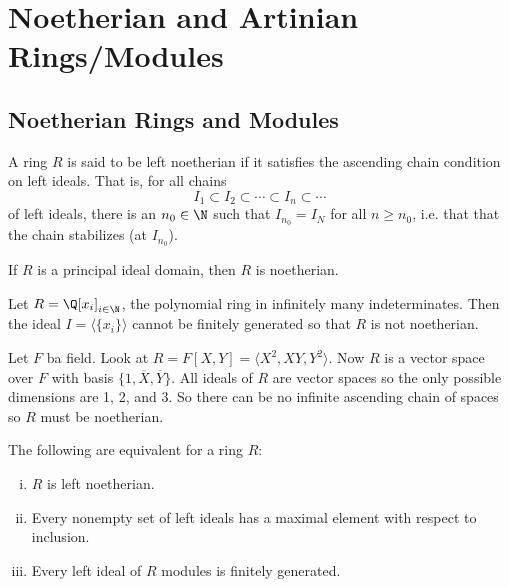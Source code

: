 
\newpage
\section{Noetherian and Artinian Rings/Modules}

\subsection{Noetherian Rings and Modules}

\begin{dfn}
A ring $R$ is said to be left noetherian if it satisfies the ascending chain condition on left ideals. That is, for all chains
\[
I_1 \subset I_2 \subset \cdots \subset I_n \subset \cdots
\]
of left ideals, there is an $n_0 \in \N$ such that $I_{n_0}=I_N$ for all $n \geq n_0$, i.e. that that the chain stabilizes (at $I_{n_0}$).
\end{dfn}

\begin{ex}
If $R$ is a principal ideal domain, then $R$ is noetherian.
\end{ex}

\begin{ex}
Let $R=\Q[x_i]_{i \in \N}$, the polynomial ring in infinitely many indeterminates. Then the ideal $I=\langle \{x_i\} \rangle$ cannot be finitely generated so that $R$ is not noetherian. 
\end{ex}

\begin{ex}
Let $F$ ba  field. Look at $R=F[X,Y]=\langle X^2,XY,Y^2\rangle$. Now $R$ is a vector space over $F$ with basis $\{1,\overline{X},\overline{Y}\}$. All ideals of $R$ are vector spaces so the only possible dimensions are 1, 2, and 3. So there can be no infinite ascending chain of spaces so $R$ must be noetherian. 
\end{ex}

\begin{thm}
The following are equivalent for a ring $R$:
\begin{enumerate}[(i)]
\item $R$ is left noetherian.
\item Every nonempty set of left ideals has a maximal element with respect to inclusion. 
\item Every left ideal of $R$ modules is finitely generated.
\end{enumerate}
\end{thm}

